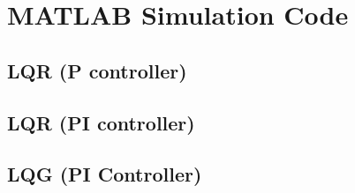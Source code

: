 \chapter{MATLAB Simulation Code}

\section{LQR (P controller)}
\label{ch:codeLQRsim}


\section{LQR (PI controller)}

\section{LQG (PI Controller)}


